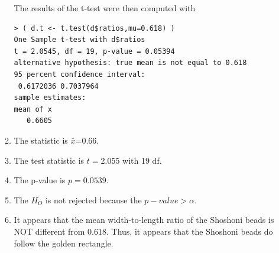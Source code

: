 \documentclass[10pt,openany]{book}\usepackage[]{graphicx}\usepackage[]{color}
\makeatletter
\newenvironment{kframe}{%
 \def\at@end@of@kframe{}%
 \ifinner\ifhmode%
  \def\at@end@of@kframe{\end{minipage}}%
  \begin{minipage}{\columnwidth}%
 \fi\fi%
 \def\FrameCommand##1{\hskip\@totalleftmargin \hskip-\fboxsep
 \colorbox{shadecolor}{##1}\hskip-\fboxsep
     \hskip-\linewidth \hskip-\@totalleftmargin \hskip\columnwidth}%
 \MakeFramed {\advance\hsize-\width
   \@totalleftmargin\z@ \linewidth\hsize
   \@setminipage}}%
 {\par\unskip\endMakeFramed%
 \at@end@of@kframe}
\newenvironment{knitrout}{}{} %
\makeatother
\begin{document}
\begin{itemize}
\begin{enumerate}
\begin{knitrout}
\end{knitrout}
The results of the t-test were then computed with
\begin{knitrout}
\color{fgcolor}\begin{kframe}
\begin{verbatim}
> ( d.t <- t.test(d$ratios,mu=0.618) )
One Sample t-test with d$ratios 
t = 2.0545, df = 19, p-value = 0.05394
alternative hypothesis: true mean is not equal to 0.618 
95 percent confidence interval:
 0.6172036 0.7037964 
sample estimates:
mean of x 
   0.6605 
\end{verbatim}
\end{kframe}
\end{knitrout}
      \item The statistic is $\bar{x}$=0.66.
      \item The test statistic is $t=$2.055 with 19 df.
      \item The p-value is $p=0.0539$.
      \item The $H_{O}$ is not rejected because the $p-value>\alpha$.
      \item It appears that the mean width-to-length ratio of the Shoshoni beads is NOT different from 0.618.  Thus, it appears that the Shoshoni beads do follow the golden rectangle.
    \end{enumerate}
\end{itemize}





\end{document}

